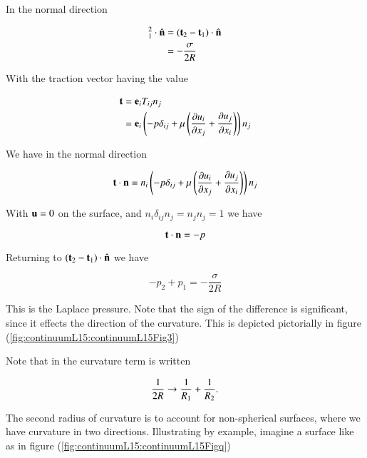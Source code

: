 In the normal direction

\begin{align*}
[\Bt]_1^2 \cdot \ncap
&= (\Bt_2 - \Bt_1) \cdot \ncap \\
&= -\frac{\sigma}{2 R} 
\end{align*}

With the traction vector having the value

\begin{align*}
\Bt 
&= \Be_i T_{ij} n_j \\
&= 
\Be_i \left( 
-p \delta_{ij} + \mu \left( 
\PD{x_j}{u_i}
+\PD{x_i}{u_j}
\right)
\right)
n_j
\end{align*}

We have in the normal direction

\begin{equation}\label{eqn:continuumL15:10}
\Bt \cdot \Bn 
=
n_i \left( 
-p \delta_{ij} + \mu \left( 
\PD{x_j}{u_i}
+\PD{x_i}{u_j}
\right)
\right) n_j
\end{equation}

With $\Bu = 0$ on the surface, and $n_i \delta_{ij} n_j = n_j n_j = 1$ we have

\begin{equation}\label{eqn:continuumL15:30}
\Bt \cdot \Bn = -p
\end{equation}

Returning to $(\Bt_2 - \Bt_1) \cdot \ncap$ we have

\begin{equation}\label{eqn:continuumL15:50}
\boxed{
-p_2 + p_1 = -\frac{\sigma}{2 R} 
}
\end{equation}

This is the Laplace pressure.  Note that the sign of the difference is significant, since it effects the direction of the curvature.  This is depicted pictorially in figure (\ref{fig:continuumL15:continuumL15Fig3})

Note that in \citep{landau1987course} the curvature term is written

\begin{equation}\label{eqn:continuumL15:70}
\inv{2 R} \rightarrow \inv{R_1} + \inv{R_2}.
\end{equation}

The second radius of curvature is to account for non-spherical surfaces, where we have curvature in two directions.  Illustrating by example, imagine a surface like as in figure (\ref{fig:continuumL15:continuumL15Figq})

